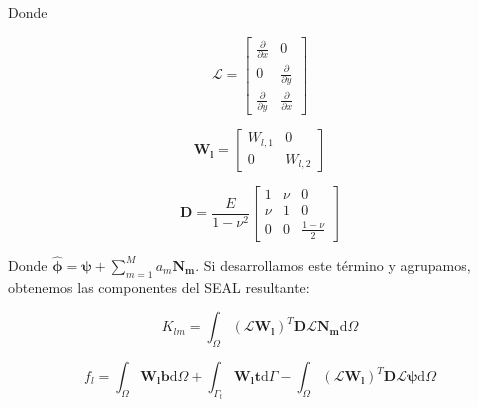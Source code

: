 \documentclass{article}
\def\domega{\mbox{d}\Omega}
\def\dgamma{\mbox{d}\Gamma}
\def\summ{\sum_{m=1}^M}
\def\partialx#1{\frac{\partial #1}{\partial x}}
\def\partialy#1{\frac{\partial #1}{\partial y}}
\begin{document}
\begin{enumerate}[1)]
{        Donde

        \[ \boldsymbol{\mathcal{L}} = 
           \left[ \begin{array}{cc} 
               \partialx{} & 0 \\ 
               0 & \partialy{} \\
               \partialy{} & \partialx{}
            \end{array} \right] \]

        \[ \boldsymbol{W_l} = 
           \left[ \begin{array}{cc} 
               W_{l,1} & 0 \\ 
               0 & W_{l,2}
            \end{array} \right] \]

        \[ \boldsymbol{D} = 
           \frac{E}{1-\nu^2}
           \left[ \begin{array}{ccc} 
               1 & \nu & 0 \\ 
               \nu & 1 & 0 \\ 
               0 & 0 & \frac{1-\nu}{2}
            \end{array} \right] \]

        Donde $\boldsymbol{\hat{\phi}} = \boldsymbol{\psi} + \summ a_m \boldsymbol{N_m}$.
        Si desarrollamos este término y agrupamos, obtenemos las componentes del
        SEAL resultante:

        \[ K_{lm} = \int_\Omega 
            \left(\boldsymbol{\mathcal{L}} \boldsymbol{W_l}\right)^T
            \boldsymbol{D} \boldsymbol{\mathcal{L}} \boldsymbol{N_m} \domega\]

        \[ f_l = \int_\Omega \boldsymbol{W_l} \boldsymbol{b} \domega + 
            \int_{\Gamma_t} \boldsymbol{W_l} \boldsymbol{t} \dgamma -
            \int_\Omega 
            \left(\boldsymbol{\mathcal{L}} \boldsymbol{W_l}\right)^T
            \boldsymbol{D} \boldsymbol{\mathcal{L}} \boldsymbol{\psi} \domega\]


    }
\end{enumerate}
\end{document}
